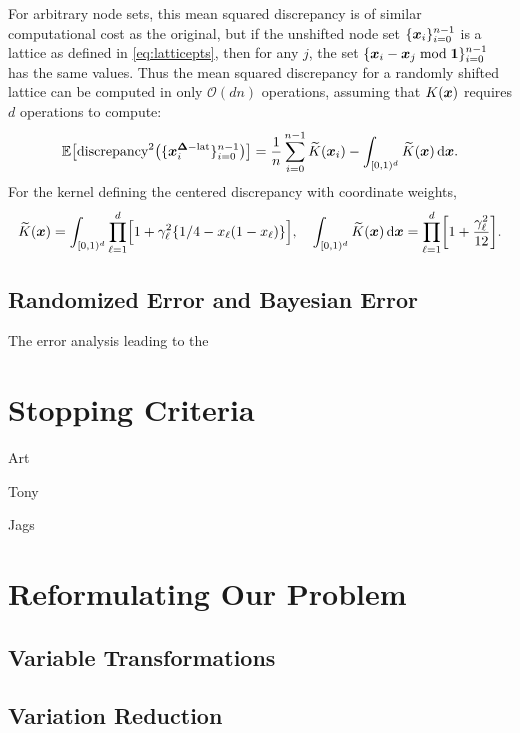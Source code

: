 \documentclass{svproc}
\begin{document}
For arbitrary node sets, this mean squared discrepancy is of similar computational cost as the original, but if the unshifted node set $\{{\boldsymbol{x}}_i\}_{i=0}^{n-1}$ is a lattice as defined in \eqref{eq:latticepts}, then for any $j$, the set $\{{\boldsymbol{x}}_i - {\boldsymbol{x}}_j \bmod {\boldsymbol{1}} \}_{i=0}^{n-1}$ has the same values.  Thus the mean squared discrepancy for a randomly shifted lattice can be computed in only $\mathcal{O}(dn)$ operations, assuming that $K({\boldsymbol{x}})$ requires $d$ operations to compute:
\begin{equation}
\mathbb{E}\bigl[\text{discrepancy}^2 \bigl (\{ {\boldsymbol{x}}^{{\boldsymbol{\Delta}}-\text{lat}}_{i} \}_{i=0}^{n-1} \bigr) \bigr] = \frac{1}{n} \sum_{i=0}^{n-1}  \widetilde{K}({\boldsymbol{x}}_i) - \int_{[0,1)^d} \widetilde{K}({\boldsymbol{x}}) \, \mathrm{d} {\boldsymbol{x}}. 
\end{equation}
For the kernel defining the centered discrepancy with coordinate weights, 
\begin{equation}
    \widetilde{K}({\boldsymbol{x}}) = \int_{[0,1)^d} \prod_{\ell = 1}^d \Bigl [ 1 + \gamma_\ell^2 \{ 1/4 - x_\ell (1-x_\ell ) \} \Bigr], \quad \int_{[0,1)^d} \widetilde{K}({\boldsymbol{x}}) \, \mathrm{d} {\boldsymbol{x}} = \prod_{\ell = 1}^d \biggl [ 1 + \frac{\gamma_\ell^2}{12} \biggr ].
\end{equation}

\subsection{Randomized Error and Bayesian Error}
The error analysis leading to the 



\section{Stopping Criteria} \label{sec:stop}

Art

Tony

Jags

\section{Reformulating Our Problem} \label{sec:reformulate}
\subsection{Variable Transformations}
\subsection{Variation Reduction}
\end{document}
